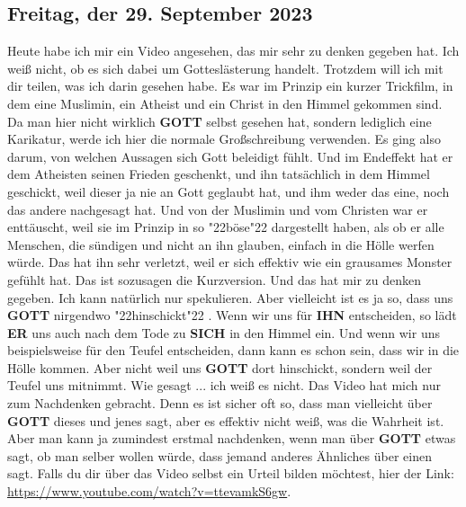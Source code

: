 \documentclass[12pt,a4paper]{article}
\newcommand{\Er}[0]{\textbf{ER}}
\newcommand{\Gott}[0]{\textbf{GOTT}}
\newcommand{\Ihn}[0]{\textbf{IHN}}
\newcommand{\Sich}[0]{\textbf{SICH}}
\newcommand{\q}[1]{\char"22{#1}\char"22 }
\begin{document}
	\subsection{Freitag, der 29. September 2023}
		Heute habe ich mir ein Video angesehen,
		das mir sehr zu denken gegeben hat.
		Ich wei{\ss} nicht,
		ob es sich dabei um Gottesl\"asterung handelt.
		Trotzdem will ich mit dir teilen,
		was ich darin gesehen habe.
		Es war im Prinzip ein kurzer Trickfilm,
		in dem eine Muslimin,
		ein Atheist und ein Christ in den Himmel gekommen sind.
		Da man hier nicht wirklich {\Gott} selbst gesehen hat,
		sondern lediglich eine Karikatur,
		werde ich hier die normale Gro{\ss}schreibung verwenden.
		Es ging also darum,
		von welchen Aussagen sich Gott beleidigt f\"uhlt.
		Und im Endeffekt hat er dem Atheisten seinen Frieden geschenkt,
		und ihn tats\"achlich in dem Himmel geschickt,
		weil dieser ja nie an Gott geglaubt hat,
		und ihm weder das eine,
		noch das andere nachgesagt hat.
		Und von der Muslimin und vom Christen war er entt\"auscht,
		weil sie im Prinzip in so \q{b\"ose} dargestellt haben,
		als ob er alle Menschen,
		die s\"undigen und nicht an ihn glauben,
		einfach in die H\"olle werfen w\"urde.
		Das hat ihn sehr verletzt,
		weil er sich effektiv wie ein grausames Monster gef\"uhlt hat.
		Das ist sozusagen die Kurzversion.
		Und das hat mir zu denken gegeben.
		Ich kann nat\"urlich nur spekulieren.
		Aber vielleicht ist es ja so,
		dass uns {\Gott} nirgendwo \q{hinschickt}.
		Wenn wir uns f\"ur {\Ihn} entscheiden,
		so l\"adt {\Er} uns auch nach dem Tode zu {\Sich} in den Himmel ein.
		Und wenn wir uns beispielsweise f\"ur den Teufel entscheiden,
		dann kann es schon sein,
		dass wir in die H\"olle kommen.
		Aber nicht weil uns {\Gott} dort hinschickt,
		sondern weil der Teufel uns mitnimmt.
		Wie gesagt ... ich wei{\ss} es nicht.
		Das Video hat mich nur zum Nachdenken gebracht.
		Denn es ist sicher oft so,
		dass man vielleicht \"uber {\Gott} dieses und jenes sagt,
		aber es effektiv nicht wei{\ss},
		was die Wahrheit ist.
		Aber man kann ja zumindest erstmal nachdenken,
		wenn man \"uber {\Gott} etwas sagt,
		ob man selber wollen w\"urde,
		dass jemand anderes \"Ahnliches \"uber einen sagt.
		Falls du dir \"uber das Video selbst ein Urteil bilden m\"ochtest,
		hier der Link: \url{https://www.youtube.com/watch?v=ttevamkS6gw}.
\end{document}
